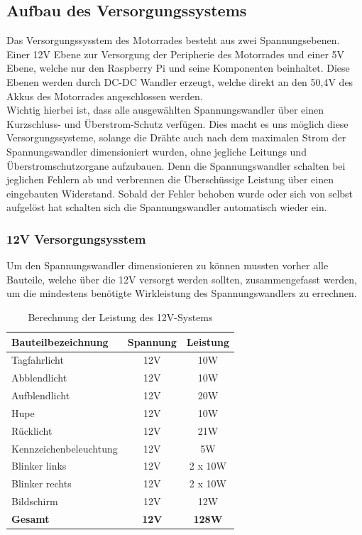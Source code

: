 \subsection{Aufbau des Versorgungssystems}
Das Versorgungssysstem des Motorrades besteht aus zwei Spannungsebenen. Einer 12V Ebene zur Versorgung der Peripherie des Motorrades und einer 5V Ebene, welche nur den Raspberry Pi und seine Komponenten beinhaltet. Diese Ebenen werden durch DC-DC Wandler erzeugt, welche direkt an den 50,4V des Akkus des Motorrades angeschlossen werden. \\
Wichtig hierbei ist, dass alle ausgewählten Spannungswandler über einen Kurzschluss- und Überstrom-Schutz verfügen. Dies macht es uns möglich diese Versorgungssysteme, solange die Drähte auch nach dem maximalen Strom der Spannungswandler dimensioniert wurden, ohne jegliche Leitungs und Überstromschutzorgane aufzubauen. Denn die Spannungswandler schalten bei jeglichen Fehlern ab und verbrennen die Überschüssige Leistung über einen eingebauten Widerstand. Sobald der Fehler behoben wurde oder sich von selbst aufgelöst hat schalten sich die Spannungswandler automatisch wieder ein.
\subsubsection{12V Versorgungsysstem}
Um den Spannungswandler dimensionieren zu können mussten vorher alle Bauteile, welche über die 12V versorgt werden sollten, zusammengefasst werden, um die mindestens benötigte Wirkleistung des Spannungswandlers zu errechnen. 
\begin{table}[H]
\begin{center}
\begin{tabular}{|l|c|c|}
\hline
\textbf{Bauteilbezeichnung}     & \textbf{Spannung} & \textbf{Leistung} \\ \hline
Tagfahrlicht           & 12V      & 10W      \\ \hline
Abblendlicht           & 12V      & 10W      \\ \hline
Aufblendlicht          & 12V      & 20W      \\ \hline
Hupe                   & 12V      & 10W      \\ \hline
Rücklicht              & 12V      & 21W      \\ \hline
Kennzeichenbeleuchtung & 12V      & 5W       \\ \hline
Blinker links          & 12V      & 2 x 10W  \\ \hline
Blinker rechts         & 12V      & 2 x 10W  \\ \hline
Bildschirm             & 12V      & 12W      \\ \hline
\textbf{Gesamt}                 & \textbf{12V}      & \textbf{128W}     \\ \hline
\end{tabular}
\caption{Berechnung der Leistung des 12V-Systems}
\label{tab:leistung12V}
\end{center}
\end{table}

